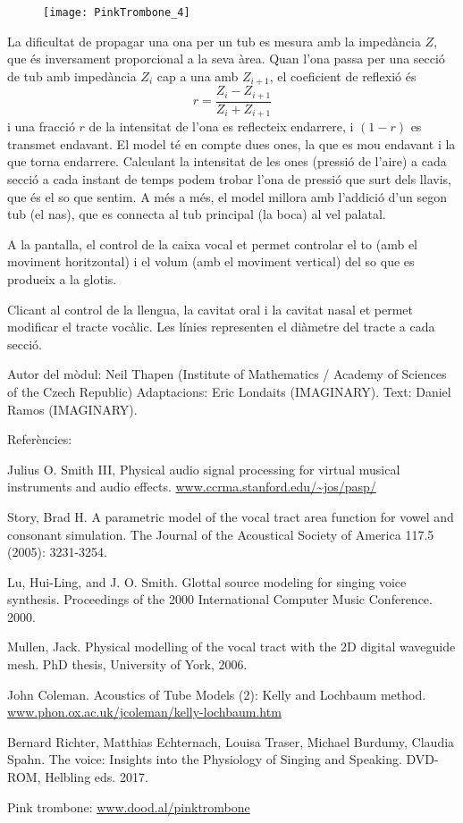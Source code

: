 \begin{figure}[h]
\centering
\texttt{[image: PinkTrombone\_4]}
\end{figure}

La dificultat de propagar una ona per un tub es mesura amb la impedància $Z$, que és inversament proporcional a la seva àrea. Quan l'ona passa per una secció de tub amb impedància $Z_i$ cap a una amb $Z_{i+1}$, el coeficient de reflexió és
$$r=\frac{Z_i - Z_{i+1}}{Z_i + Z_{i+1}}$$
i una fracció $r$ de la intensitat de l'ona es reflecteix endarrere, i $(1-r)$ es transmet endavant. El model té en compte dues ones, la que es mou endavant i la que torna endarrere. Calculant la intensitat de les ones (pressió de l'aire) a cada secció a cada instant de temps podem trobar l'ona de pressió que surt dels llavis, que és el so que sentim. A més a més, el model millora amb l'addició d'un segon tub (el nas), que es connecta al tub principal (la boca) al vel palatal.

A la pantalla, el control de la caixa vocal et permet controlar el to (amb el moviment horitzontal) i el volum (amb el moviment vertical) del so que es produeix a la glotis.

Clicant al control de la llengua, la cavitat oral i la cavitat nasal et permet modificar el tracte vocàlic. Les línies representen el diàmetre del tracte a cada secció.

\vfill

Autor del mòdul: Neil Thapen (Institute of Mathematics / Academy of Sciences of the Czech Republic)
Adaptacions: Eric Londaits (IMAGINARY).
Text: Daniel Ramos (IMAGINARY).


Referències:

Julius O. Smith III, Physical audio signal processing for virtual musical instruments and audio effects. \url{www.ccrma.stanford.edu/~jos/pasp/}

Story, Brad H. A parametric model of the vocal tract area function for vowel and consonant simulation. The Journal of the Acoustical Society of America 117.5 (2005): 3231-3254.

Lu, Hui-Ling, and J. O. Smith. Glottal source modeling for singing voice synthesis. Proceedings of the 2000 International Computer Music Conference. 2000.

Mullen, Jack. Physical modelling of the vocal tract with the 2D digital waveguide mesh. PhD thesis, University of York, 2006.

John Coleman. Acoustics of Tube Models (2): Kelly and Lochbaum method. \url{www.phon.ox.ac.uk/jcoleman/kelly-lochbaum.htm}

Bernard Richter, Matthias Echternach, Louisa Traser, Michael Burdumy, Claudia Spahn. The voice: Insights into the Physiology of Singing and Speaking. DVD-ROM, Helbling eds. 2017.

Pink trombone: \url{www.dood.al/pinktrombone}

